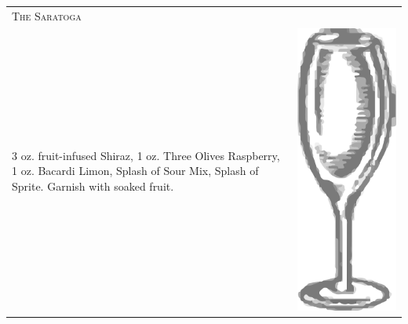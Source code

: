 \documentclass{article}
\begin{document}
\begin{multicols}{2}
\begin{tabular}{p{2in} p{0.5in}}
\multicolumn{2}{p{3in}}{\centering\Huge\textsc{The Saratoga}} \\ 
  \vspace{-0.1in}3 oz. fruit-infused Shiraz, 1 oz. Three Olives Raspberry, 1 oz. Bacardi Limon, Splash of Sour Mix, Splash of Sprite. Garnish with soaked fruit. &
  \vspace{-0.1in} \includegraphics{wine_glass.png}
\end{tabular}
\end{multicols}
\end{document}
